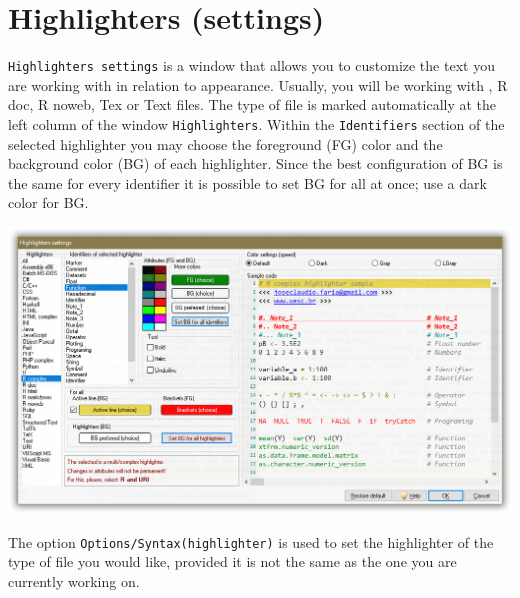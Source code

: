 
\section{Highlighters (settings)}

\texttt{Highlighters settings} is a window that allows you to customize the text you are working with in relation to appearance.
Usually, you will be working with \RR{}, R doc, R noweb, Tex or Text files.
The type of file is marked automatically at the left column of the window \texttt{Highlighters}.
Within the \texttt{Identifiers} section of the selected highlighter you may choose the foreground (FG)
color and the background color (BG) of each highlighter. Since the best configuration of BG is the same for every
identifier it is possible to set BG for all at once; use a dark color for BG.

\vspace{5mm}
\includegraphics[width=\headwidth]{./res/dlg_highlighter_settings.png}
\vspace{5mm}

The option \texttt{Options/Syntax(highlighter)} is used to set the highlighter of the type of file you would like,
provided it is not the same as the one you are currently working on.
